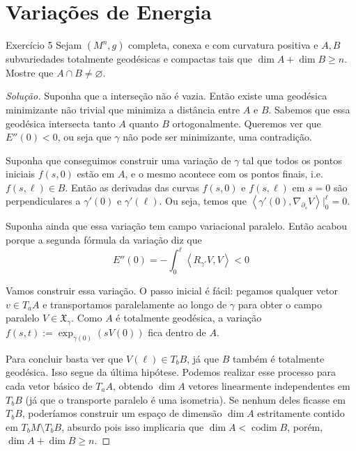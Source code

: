 \section{Variações de Energia}

\begin{thing6}{Exercício 5}\label{exer:5}\leavevmode
Sejam \((M^n,g)\) completa, conexa e com curvatura positiva e \(A,B\) subvariedades totalmente geodésicas e compactas tais que \(\dim A + \dim B \geq  n\). Mostre que \(A \cap B \neq  \varnothing\).
\end{thing6}

\begin{proof}[Solução]\leavevmode
	Suponha que a interseção não é vazia. Então existe uma geodésica minimizante não trivial que minimiza a distância entre \(A\) e \(B\). Sabemos que essa geodésica intersecta tanto \(A\) quanto \(B\) ortogonalmente. Queremos ver que \(E''(0)<0\), ou seja que \(\gamma\) não pode ser minimizante, uma contradição.

	Suponha que conseguimos construir uma variação de \(\gamma\) tal que todos os pontos iniciais \(f(s,0)\) estão em \(A\), e o mesmo acontece com os pontos finais, i.e. \(f(s,\ell) \in B\). Então as derivadas das curvas \(f(s,0)\) e \(f(s,\ell)\) em \(s=0\) são perpendiculares a  \(\gamma'(0)\) e \(\gamma'(\ell)\). Ou seja, temos que \(\left<\gamma'(0),\nabla_{\partial_s}V\right>|_{0}^\ell=0\).

	Suponha ainda que essa variação tem campo variacional paralelo. Então acabou porque a segunda fórmula da variação diz que
\[E''(0)=-\int_0^\ell \left<R_{\gamma'}V,V\right><0\]

Vamos construir essa variação. O passo inicial é fácil: pegamos qualquer vetor \(v \in T_a A\) e transportamos paralelamente ao longo de \(\gamma\) para obter o campo paralelo \(V \in \mathfrak{X}_\gamma\). Como \(A\) é totalmente geodésica, a variação \(f(s,t):=\operatorname{exp}_{\gamma(0)}(sV(0))\) fica dentro de \(A\).

Para concluir basta ver que \( V(\ell) \in T_bB\), já que \(B\) também é totalmente geodésica. Isso segue da última hipótese. Podemos realizar esse processo para cada vetor básico de  \(T_a A\), obtendo \(\dim A\) vetores linearmente independentes em \(T_bB\) (já que o transporte paralelo é uma isometria). Se nenhum deles ficasse em \(T_bB\), poderíamos construir um espaço de dimensão \(\dim A\) estritamente contido em \(T_b M\setminus T_b B\), absurdo pois isso implicaria que \(\dim A< \operatorname{codim} B\), porém, \(\dim A+ \dim B \geq n\).



\end{proof}
